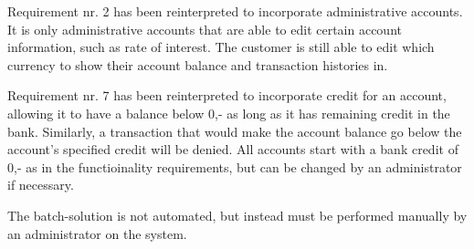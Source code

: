 Requirement nr. 2 has been reinterpreted to incorporate administrative accounts. It is only administrative accounts that are able to edit certain account information, such as rate of interest. The customer is still able to edit which currency to show their account balance and transaction histories in.

Requirement nr. 7 has been reinterpreted to incorporate credit for an account, allowing it to have a balance below 0,- as long as it has remaining credit in the bank. Similarly, a transaction that would make the account balance go below the account's specified credit will be denied. All accounts start with a bank credit of 0,- as in the functioinality requirements, but can be changed by an administrator if necessary.



The batch-solution is not automated, but instead must be performed manually by an administrator on the system.
